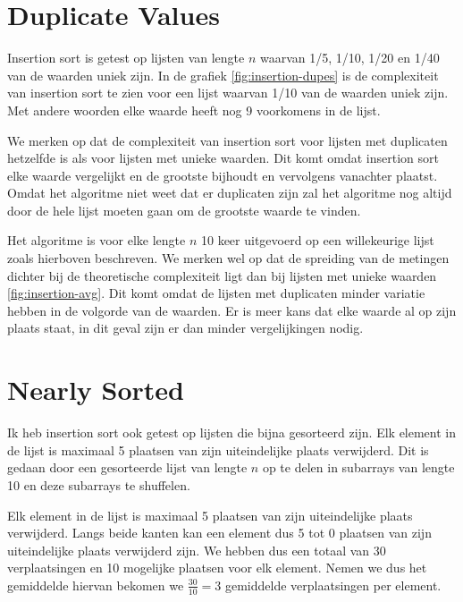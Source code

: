 \documentclass[a4paper]{article}
\begin{document}
\section{Duplicate Values}
Insertion sort is getest op lijsten van lengte $n$ waarvan 1/5, 1/10, 1/20 en 1/40 van de waarden uniek zijn. 
In de grafiek \ref{fig:insertion-dupes} is de complexiteit van insertion sort te zien voor een lijst waarvan 1/10 van de waarden uniek zijn.
Met andere woorden elke waarde heeft nog 9 voorkomens in de lijst.
\par 
We merken op dat de complexiteit van insertion sort voor lijsten met duplicaten hetzelfde is als voor lijsten met unieke waarden.
Dit komt omdat insertion sort elke waarde vergelijkt en de grootste bijhoudt en vervolgens vanachter plaatst.
Omdat het algoritme niet weet dat er duplicaten zijn zal het algoritme nog altijd door de hele lijst moeten gaan om de grootste waarde te vinden.
\par
Het algoritme is voor elke lengte $n$ 10 keer uitgevoerd op een willekeurige lijst zoals hierboven beschreven.
We merken wel op dat de spreiding van de metingen dichter bij de theoretische complexiteit ligt dan bij lijsten met unieke waarden \ref{fig:insertion-avg}.
Dit komt omdat de lijsten met duplicaten minder variatie hebben in de volgorde van de waarden.
Er is meer kans dat elke waarde al op zijn plaats staat, in dit geval zijn er dan minder vergelijkingen nodig.

\section{Nearly Sorted}
Ik heb insertion sort ook getest op lijsten die bijna gesorteerd zijn. Elk element in de lijst is maximaal 5 plaatsen van zijn uiteindelijke plaats verwijderd.
Dit is gedaan door een gesorteerde lijst van lengte $n$ op te delen in subarrays van lengte 10 en deze subarrays te shuffelen.
\par
Elk element in de lijst is maximaal 5 plaatsen van zijn uiteindelijke plaats verwijderd.
Langs beide kanten kan een element dus 5 tot 0 plaatsen van zijn uiteindelijke plaats verwijderd zijn.
We hebben dus een totaal van 30 verplaatsingen en 10 mogelijke plaatsen voor elk element.
Nemen we dus het gemiddelde hiervan bekomen we $\frac{30}{10}=3$ gemiddelde verplaatsingen per element.
\end{document}
